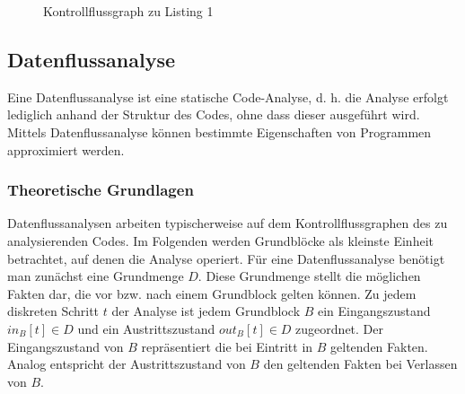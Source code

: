 \begin{figure}[H]
\centering
{}
\caption{Kontrollflussgraph zu Listing 1}
\end{figure}

\par

\subsection{Datenflussanalyse}
Eine Datenflussanalyse ist eine statische Code-Analyse, d. h. die Analyse erfolgt lediglich anhand der Struktur des Codes, ohne dass dieser ausgeführt wird. 
Mittels Datenflussanalyse können bestimmte Eigenschaften von Programmen approximiert werden.

\subsubsection{Theoretische Grundlagen}

Datenflussanalysen arbeiten typischerweise auf dem Kontrollflussgraphen des zu analysierenden Codes.
Im Folgenden werden Grundblöcke als kleinste Einheit betrachtet, auf denen die Analyse operiert.
Für eine Datenflussanalyse benötigt man zunächst eine Grundmenge $D$.
Diese Grundmenge stellt die möglichen Fakten dar, die vor bzw. nach einem Grundblock gelten können.
Zu jedem diskreten Schritt $t$ der Analyse ist jedem Grundblock $B$ ein Eingangszustand $in_B[t] \in D$ und ein Austrittszustand $out_B[t] \in D$ zugeordnet.
Der Eingangszustand von $B$ repräsentiert die bei Eintritt in $B$ geltenden Fakten.
Analog entspricht der Austrittszustand von $B$ den geltenden Fakten bei Verlassen von $B$.

